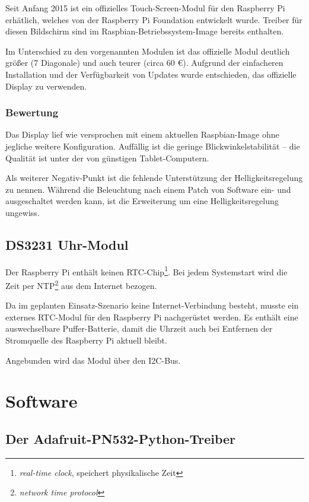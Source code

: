 \documentclass[11pt,a4paper]{IEEEtran}
\begin{document}
Seit Anfang 2015 ist ein offizielles Touch-Screen-Modul für den Raspberry Pi 
erhätlich, welches von der Raspberry Pi Foundation entwickelt wurde. Treiber
für diesen Bildschirm sind im Raspbian-Betriebssystem-Image bereits enthalten.

Im Unterschied zu den vorgenannten Modulen ist das offizielle Modul deutlich 
größer (\SI{7}{\inch} Diagonale) und auch teurer (circa 60 \euro). Aufgrund
der einfacheren Installation und der Verfügbarkeit von Updates wurde entschieden,
das offizielle Display zu verwenden.

\subsubsection{Bewertung}

Das Display lief wie versprochen mit einem aktuellen Raspbian-Image ohne
jegliche weitere Konfiguration. Auffällig ist die geringe Blickwinkelstabilität
 -- die Qualität ist unter der von günstigen Tablet-Computern. 

Als weiterer Negativ-Punkt ist die fehlende Unterstützung der
Helligkeitsregelung zu nennen. Während die Beleuchtung nach einem Patch von
Software ein- und ausgeschaltet werden kann, ist die Erweiterung um eine
Helligkeitsregelung ungewiss\autocite{TouchBacklight}.

\subsection{DS3231 Uhr-Modul}

Der Raspberry Pi enthält keinen RTC-Chip\footnote{\emph{real-time clock},
speichert physikalische Zeit}. Bei jedem Systemstart wird die Zeit per
NTP\footnote{\emph{network time protocol}} aus dem Internet bezogen.

Da im geplanten Einsatz-Szenario keine Internet-Verbindung besteht, musste ein
externes RTC-Modul für den Raspberry Pi nachgerüstet werden. Es enthält eine
auswechselbare Puffer-Batterie, damit die Uhrzeit auch bei Entfernen der 
Stromquelle des Raspberry Pi aktuell bleibt. 


Angebunden wird das Modul über den I2C-Bus.

\section{Software}
\label{sec:sw}

\subsection{Der Adafruit-PN532-Python-Treiber} %
\end{document}
